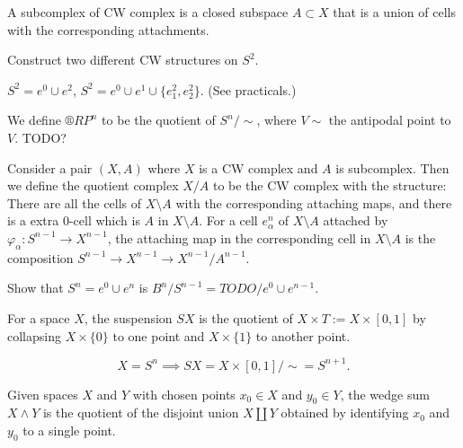 \documentclass[12pt]{article}					%
\begin{document}
\begin{definice}
	A subcomplex of CW complex is a closed subspace $A \subset X$ that is a union of cells with the corresponding attachments.
\end{definice}

\begin{priklad}
	Construct two different CW structures on $S^2$.
	
	\begin{reseni}
		$S^2 = e^0 \cup e^2$, $S^2 = e^0 \cup e^1 \cup \{e^2_1, e^2_2\}$. (See practicals.)
	\end{reseni}
\end{priklad}

\begin{priklad}
	We define $®RP^n$ to be the quotient of $S^n / \sim$, where $V \sim $ the antipodal point to $V$. TODO?
\end{priklad}

\begin{definice}
	Consider a pair $(X, A)$ where $X$ is a CW complex and $A$ is subcomplex. Then we define the quotient complex $X / A$ to be the CW complex with the structure: There are all the cells of $X \setminus A$ with the corresponding attaching maps, and there is a extra $0$-cell which is $A$ in $X \setminus A$. For a cell $e_α^n$ of $X \setminus A$ attached by $φ_α: S^{n-1} \rightarrow X^{n - 1}$, the attaching map in the corresponding cell in $X \setminus A$ is the composition $S^{n-1} \rightarrow X^{n-1} \rightarrow X^{n-1} / A^{n-1}$.
\end{definice}

\begin{priklad}
	Show that $S^n = e^0 \cup e^n$ is $B^n / S^{n-1} = TODO / e^0 \cup e^{n-1}$.
\end{priklad}


\begin{definice}[Suspension]
	For a space $X$, the suspension $SX$ is the quotient of $X \times T := X \times [0, 1]$ by collapsing $X \times \{0\}$ to one point and $X \times \{1\}$ to another point.

	\begin{prikladyin}[Motivation]
		$$ X = S^n \implies SX = X \times [0, 1] / \sim = S^{n+1}. $$
	\end{prikladyin}
\end{definice}

\begin{definice}
	Given spaces $X$ and $Y$ with chosen points $x_0 \in X$ and $y_0 \in Y$, the wedge sum $X \wedge Y$ is the quotient of the disjoint union $X \coprod Y$ obtained by identifying $x_0$ and $y_0$ to a single point.
\end{definice}
\end{document}
